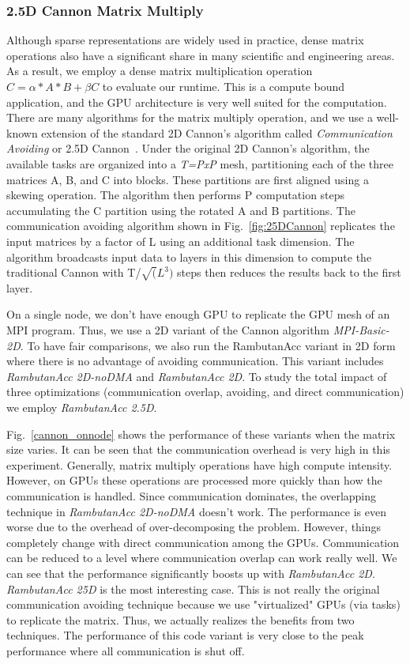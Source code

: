 \subsubsection{2.5D Cannon Matrix Multiply}
Although sparse representations are widely used in practice, dense matrix operations also have a significant share in many scientific and engineering areas.
As a result, we employ a dense matrix multiplication operation $C = \alpha* A * B + \beta C$ to evaluate our runtime.
This is a compute bound application, and the GPU architecture is very well suited for the computation. 
There are many algorithms for the matrix multiply operation, and we use a well-known extension of the standard 2D Cannon's algorithm called {\em Communication Avoiding} or 2.5D Cannon~\cite{25Dcannon}. 
Under the original 2D Cannon's algorithm, the available tasks are organized into a {\em T=PxP} mesh, partitioning each of the three matrices A, B, and C into blocks.
These partitions are first aligned using a skewing operation.
The algorithm then performs P computation steps accumulating the C partition using the rotated A and B partitions.
The communication avoiding algorithm shown in Fig.~\ref{fig:25DCannon} replicates the input matrices by a factor of L using an additional task dimension.
The algorithm broadcasts input data to layers in this dimension to compute the traditional Cannon with T/$\sqrt(L^3)$ steps then reduces the results back to the first layer.

On a single node, we don't have enough GPU to replicate the GPU mesh of an MPI program.
Thus, we use a 2D variant of the Cannon algorithm {\em MPI-Basic-2D}.
To have fair comparisons, we also run the RambutanAcc variant in 2D form where there is no advantage of avoiding communication.
This variant includes {\em RambutanAcc 2D-noDMA} and {\em RambutanAcc 2D}.
To study the total impact of three optimizations (communication overlap, avoiding, and direct communication) we employ {\em RambutanAcc 2.5D}.

Fig.~\ref{cannon_onnode} shows the performance of these variants when the matrix size varies.
It can be seen that the communication overhead is very high in this experiment.
Generally, matrix multiply operations have high compute intensity.
However, on GPUs these operations are processed more quickly than how the communication is handled.
Since communication dominates, the overlapping technique in {\em RambutanAcc 2D-noDMA} doesn't work.
The performance is even worse due to the overhead of over-decomposing the problem.
However, things completely change with direct communication among the GPUs.
Communication can be reduced to a level where communication overlap can work really well.
We can see that the performance significantly boosts up with {\em RambutanAcc 2D}.
{\em RambutanAcc 25D} is the most interesting case.
This is not really the original communication avoiding technique because we use "virtualized" GPUs (via tasks) to replicate the matrix. 
Thus, we actually realizes the benefits from two techniques.
The performance of this code variant is very close to the peak performance where all communication is shut off.




